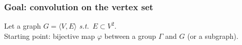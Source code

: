 \documentclass[t,9pt,pdftex]{beamer}
\theoremstyle{definition}
\newcommand{\cs}{\mathcal{S}}
\newcommand{\st}{\emph{s.t.}~}
\newcommand{\gve}{G = \langle V, E \rangle}
\begin{document}



\begin{frame}[c, label=current]
  \frametitle{Goal: convolution on the vertex set}

    Let a graph $G = \langle V,E \rangle$ \st $E \subset V^2$.\\
    Starting point: bijective map $\varphi$ between a group $\Gamma$ and $G$ (or a subgraph).
    \begin{figure}
    \scalebox{2.}
    {}
    \end{figure}
   
\end{frame}
\end{document}
